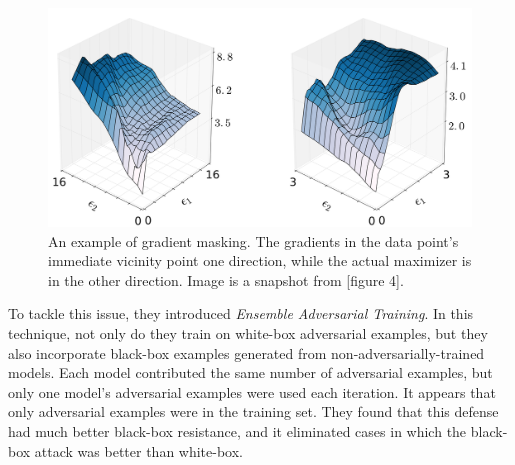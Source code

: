 \begin{figure}[th]
    \begin{center}
        \includegraphics[width = \linewidth]{Friendly/LaTeX/figures/maskinggraphs.png}
        \caption{An example of gradient masking. The gradients in the data point's immediate
                 vicinity point one direction, while the actual maximizer is in the other direction.
                 Image is a snapshot from \cite{tramèr2020ensemble}[figure 4].}
        \label{badgradients}
    \end{center}
\end{figure}

To tackle this issue, they introduced \textit{Ensemble Adversarial Training}. In this technique,
not only do they train on white-box adversarial examples, but they also incorporate black-box
examples generated from non-adversarially-trained models. Each model contributed the same number
of adversarial examples, but only one model's adversarial examples were used each iteration. It
appears that only adversarial examples were in the training set. They found that this defense had
much better black-box resistance, and it eliminated cases in which the black-box attack was better
than white-box.